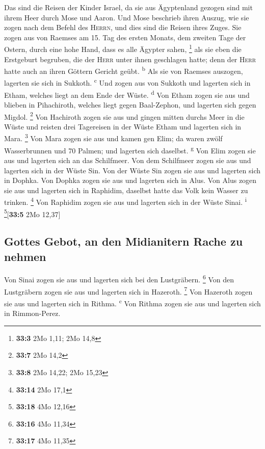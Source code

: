  Das sind die Reisen der Kinder Israel, da sie aus
Ägyptenland gezogen sind mit ihrem Heer durch Mose und Aaron.
 Und Mose beschrieb ihren Auszug, wie sie zogen nach dem
Befehl des \textsc{Herrn}, und dies sind die Reisen ihres Zuges.
 Sie zogen aus von Raemses am 15. Tag des ersten Monats,
dem zweiten Tage der Ostern, durch eine hohe Hand, dass es alle Ägypter
sahen, \footnote{\textbf{33:3} 2Mo 1,11; 2Mo 14,8}  als
sie eben die Erstgeburt begruben, die der \textsc{Herr} unter ihnen
geschlagen hatte; denn der \textsc{Herr} hatte auch an ihren Göttern
Gericht geübt. \textsuperscript{b}  Als sie von Raemses
auszogen, lagerten sie sich in Sukkoth. \textsuperscript{c}
 Und zogen aus von Sukkoth und lagerten sich in Etham,
welches liegt an dem Ende der Wüste. \textsuperscript{d} 
Von Etham zogen sie aus und blieben in Pihachiroth, welches liegt gegen
Baal-Zephon, und lagerten sich gegen Migdol. \footnote{\textbf{33:7} 2Mo
  14,2}  Von Hachiroth zogen sie aus und gingen mitten
durchs Meer in die Wüste und reisten drei Tagereisen in der Wüste Etham
und lagerten sich in Mara. \footnote{\textbf{33:8} 2Mo 14,22; 2Mo 15,23}
 Von Mara zogen sie aus und kamen gen Elim; da waren zwölf
Wasserbrunnen und 70 Palmen; und lagerten sich daselbst.
\textsuperscript{g}  Von Elim zogen sie aus und lagerten
sich an das Schilfmeer.  Von dem Schilfmeer zogen sie aus
und lagerten sich in der Wüste Sin.  Von der Wüste Sin
zogen sie aus und lagerten sich in Dophka.  Von Dophka
zogen sie aus und lagerten sich in Alus.  Von Alus zogen
sie aus und lagerten sich in Raphidim, daselbst hatte das Volk kein
Wasser zu trinken. \footnote{\textbf{33:14} 2Mo 17,1} 
Von Raphidim zogen sie aus und lagerten sich in der Wüste Sinai.
\textsuperscript{i} \footnote{\textbf{33:18} 4Mo 12,16}{[}\textbf{33:5}
2Mo 12,37{]}

\hypertarget{gottes-gebot-an-den-midianitern-rache-zu-nehmen}{%
\subsection{Gottes Gebot, an den Midianitern Rache zu
nehmen}\label{gottes-gebot-an-den-midianitern-rache-zu-nehmen}}

 Von Sinai zogen sie aus und lagerten sich bei den
Lustgräbern. \footnote{\textbf{33:16} 4Mo 11,34}  Von den
Lustgräbern zogen sie aus und lagerten sich in Hazeroth. \footnote{\textbf{33:17}
  4Mo 11,35}  Von Hazeroth zogen sie aus und lagerten
sich in Rithma. \textsuperscript{c}  Von Rithma zogen sie
aus und lagerten sich in Rimmon-Perez.

